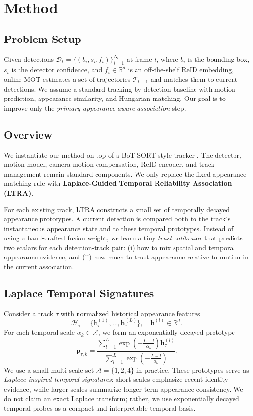 \section{Method}
\subsection{Problem Setup}
Given detections $\mathcal{D}_t=\{(b_i, s_i, f_i)\}_{i=1}^{N_t}$ at frame $t$, where $b_i$ is the bounding box, $s_i$ is the detector confidence, and $f_i \in \mathbb{R}^{d}$ is an off-the-shelf ReID embedding, online MOT estimates a set of trajectories $\mathcal{T}_{t-1}$ and matches them to current detections. We assume a standard tracking-by-detection baseline with motion prediction, appearance similarity, and Hungarian matching. Our goal is to improve only the \emph{primary appearance-aware association} step.

\subsection{Overview}
We instantiate our method on top of a BoT-SORT style tracker \cite{aharon2022botsort}. The detector, motion model, camera-motion compensation, ReID encoder, and track management remain standard components. We only replace the fixed appearance-matching rule with \textbf{Laplace-Guided Temporal Reliability Association (LTRA)}.

For each existing track, LTRA constructs a small set of temporally decayed appearance prototypes. A current detection is compared both to the track's instantaneous appearance state and to these temporal prototypes. Instead of using a hand-crafted fusion weight, we learn a tiny \emph{trust calibrator} that predicts two scalars for each detection-track pair: (i) how to mix spatial and temporal appearance evidence, and (ii) how much to trust appearance relative to motion in the current association.

\subsection{Laplace Temporal Signatures}
Consider a track $\tau$ with normalized historical appearance features
\begin{equation}
\mathcal{H}_{\tau}=\{\mathbf{h}_{\tau}^{(1)}, \dots, \mathbf{h}_{\tau}^{(L)}\}, \quad \mathbf{h}_{\tau}^{(l)} \in \mathbb{R}^{d}.
\end{equation}
For each temporal scale $\alpha_k \in \mathcal{A}$, we form an exponentially decayed prototype
\begin{equation}
\mathbf{p}_{\tau,k}=\frac{\sum_{l=1}^{L}\exp\!\left(-\frac{L-l}{\alpha_k}\right)\mathbf{h}_{\tau}^{(l)}}{\sum_{l=1}^{L}\exp\!\left(-\frac{L-l}{\alpha_k}\right)}.
\end{equation}
We use a small multi-scale set $\mathcal{A}=\{1,2,4\}$ in practice. These prototypes serve as \emph{Laplace-inspired temporal signatures}: short scales emphasize recent identity evidence, while larger scales summarize longer-term appearance consistency. We do not claim an exact Laplace transform; rather, we use exponentially decayed temporal probes as a compact and interpretable temporal basis.

